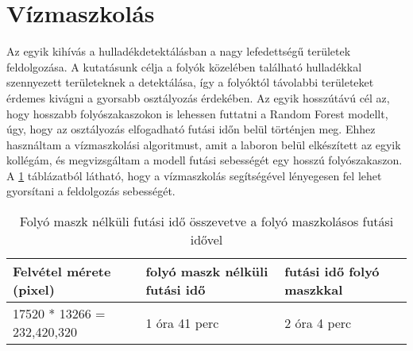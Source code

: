 \section{Vízmaszkolás}

Az egyik kihívás a hulladékdetektálásban a nagy lefedettségű területek feldolgozása. A kutatásunk célja a folyók közelében található hulladékkal szennyezett területeknek a detektálása, így a folyóktól távolabbi területeket érdemes kivágni a gyorsabb osztályozás érdekében. Az egyik hosszútávú cél az, hogy hosszabb folyószakaszokon is lehessen futtatni a Random Forest modellt, úgy, hogy az osztályozás elfogadható futási időn belül történjen meg.
Ehhez használtam a vízmaszkolási algoritmust, amit a laboron belül elkészített az egyik kollégám, és megvizsgáltam a modell futási sebességét egy hosszú folyószakaszon. A \ref{tab:river-mask-performance} táblázatból látható, hogy a vízmaszkolás segítségével lényegesen fel lehet gyorsítani a feldolgozás sebességét.

\begin{table}[H]
	\centering
	\begin{tabular}{ | p{} | p{} | p{} | }
		\hline
		\textbf{Felvétel mérete (pixel)} & \textbf{folyó maszk nélküli futási idő} & \textbf{futási idő folyó maszkkal} \\
		\hline \hline
		 17520 * 13266 = 232,420,320 & 1 óra 41 perc & 2 óra 4 perc \\
		\hline
	\end{tabular}
	\caption{Folyó maszk nélküli futási idő összevetve a folyó maszkolásos futási idővel}
	\label{tab:river-mask-performance}
\end{table}

